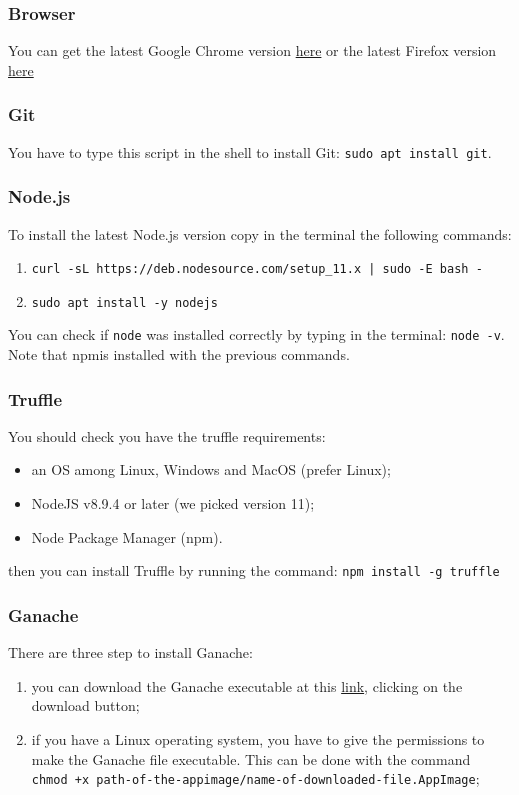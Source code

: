\subsubsection{Browser}
You can get the latest Google Chrome version 
\href{https://www.google.com/chrome/}{here} or the latest Firefox version \href{https://www.mozilla.org/en-US/firefox/new/}{here}\\

\subsubsection{Git}
You have to type this script in the shell to install Git: 
\texttt{sudo apt install git}.

\subsubsection{Node.js}
To install the latest Node.js version copy in the terminal the following commands:
\begin{enumerate}
	\item \texttt{curl -sL https://deb.nodesource.com/setup\_11.x | sudo -E bash -}
	\item \texttt{sudo apt install -y nodejs}
\end{enumerate} 
You can check if \texttt{node} was installed correctly by typing in the 
terminal: \texttt{node -v}.\\
Note that npm\glosp is installed with the previous commands.

\subsubsection{Truffle}
You should check you have the truffle requirements:
\begin{itemize}
	\item an OS among Linux, Windows and MacOS (prefer Linux);
	\item NodeJS v8.9.4 or later (we picked version 11);
	\item Node Package Manager (npm\glo).
\end{itemize}
then you can install Truffle by running the command: \texttt{npm install -g truffle}


\subsubsection{Ganache}
There are three step to install Ganache:
\begin{enumerate}
	\item you can download the Ganache executable at this \href{https://truffleframework.com/ganache}{link}, clicking on the download button;
	\item if you have a Linux operating system, you have to give the permissions to make the Ganache file executable. This can be done with the command \\\texttt{chmod +x path-of-the-appimage/name-of-downloaded-file.AppImage};
\end{enumerate}

